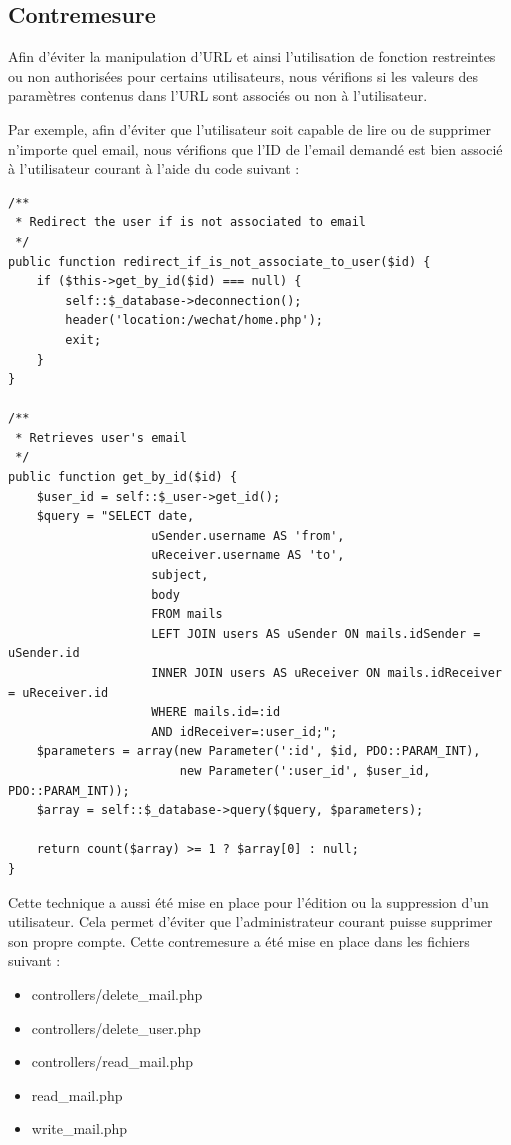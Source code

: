 \documentclass[12pt]{article}
\begin{document}
\subsection{Contremesure}\label{c1}

Afin d'éviter la manipulation d'URL et ainsi l'utilisation de fonction restreintes ou non authorisées pour certains utilisateurs, nous vérifions si les valeurs des paramètres contenus dans l'URL sont associés ou non à l'utilisateur. 

Par exemple, afin d'éviter que l'utilisateur soit capable de lire ou de supprimer n'importe quel email, nous vérifions que l'ID de l'email demandé est bien associé à l'utilisateur courant à l'aide du code suivant : 

\begin{lstlisting}[style=JAVA]
/**
 * Redirect the user if is not associated to email
 */
public function redirect_if_is_not_associate_to_user($id) {
    if ($this->get_by_id($id) === null) {
        self::$_database->deconnection();
        header('location:/wechat/home.php');
        exit;
    }
}

/**
 * Retrieves user's email
 */
public function get_by_id($id) {
    $user_id = self::$_user->get_id();
    $query = "SELECT date, 
                    uSender.username AS 'from', 
                    uReceiver.username AS 'to', 
                    subject, 
                    body 
                    FROM mails 
                    LEFT JOIN users AS uSender ON mails.idSender = uSender.id 
                    INNER JOIN users AS uReceiver ON mails.idReceiver = uReceiver.id 
                    WHERE mails.id=:id 
                    AND idReceiver=:user_id;";
    $parameters = array(new Parameter(':id', $id, PDO::PARAM_INT),
                        new Parameter(':user_id', $user_id, PDO::PARAM_INT));
    $array = self::$_database->query($query, $parameters);

    return count($array) >= 1 ? $array[0] : null;
}
\end{lstlisting}

Cette technique a aussi été mise en place pour l'édition ou la suppression d'un utilisateur. Cela permet d'éviter que l'administrateur courant puisse supprimer son propre compte.
Cette contremesure a été mise en place dans les fichiers suivant :

\begin{itemize}
\item controllers/delete\_mail.php
\item controllers/delete\_user.php
\item controllers/read\_mail.php
\item read\_mail.php
\item write\_mail.php
\end{itemize}
\end{document}
